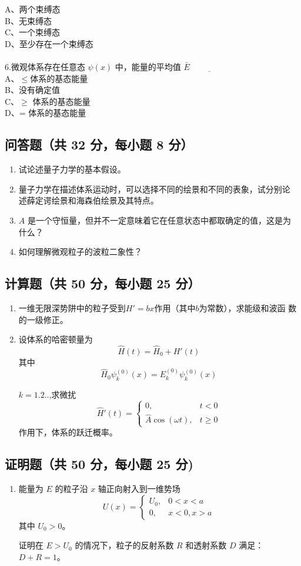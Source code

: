     A、两个束缚态\\
    B、无束缚态\\
    C、一个束缚态\\
    D、至少存在一个束缚态\\\\
6.微观体系存在任意态 $\psi(x)$ 中，能量的平均值 $\bar{E}\underline{\hspace{2cm}}$\\
    A、$\leq$体系的基态能量\\
    B、没有确定值\\
    C、$\geq$ 体系的基态能量 \\
    D、= 体系的基态能量\\
\subsection{问答题（共 32 分，每小题 8 分）}
\begin{enumerate}
\item 试论述量子力学的基本假设。
\item 量子力学在描述体系运动时，可以选择不同的绘景和不同的表象，试分别论
述薛定谔绘景和海森伯绘景及其特点。
\item $A$ 是一个守恒量，但并不一定意味着它在任意状态中都取确定的值，这是为
什么？
\item 如何理解微观粒子的波粒二象性？
\end{enumerate}
\subsection{计算题（共 50 分，每小题 25 分）}
\begin{enumerate}
\item 一维无限深势阱中的粒子受到$H' = bx$作用（其中$b$为常数），求能级和波函
数的一级修正。
\item 设体系的哈密顿量为 
\[
\hat{H}(t) = \hat{H}_0 + H'(t)~
\]
其中
\[
\hat{H}_0 \psi_k^{(0)}(x) = E_k^{(0)} \psi_k^{(0)}(x)~
\]

$k=1.2..$,求微扰
\[
\hat{H}'(t) = 
\begin{cases} 
0, & t < 0 \\
\hat{A} \cos(\omega t), & t \geq 0 
\end{cases}~
\]
作用下，体系的跃迁概率。

\end{enumerate}
\subsection{证明题（共 50 分，每小题 25 分)}
\begin{enumerate}
\item 能量为 $E$ 的粒子沿 $x$ 轴正向射入到一维势场 
\[
U(x) = 
\begin{cases} 
U_0, & 0 < x < a \\
0, & x < 0 , x > a 
\end{cases}~
\]
其中 $U_0 > 0$。

证明在 $E > U_0$ 的情况下，粒子的反射系数 $R$ 和透射系数 $D$ 满足：$D + R = 1$。

\end{enumerate}

